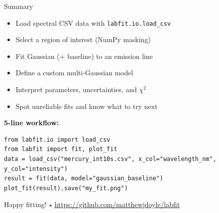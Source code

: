 \documentclass[handout, 10pt]{beamer}
\begin{document}
\begin{frame}[fragile]{Summary}

\begin{tcolorbox}[colback=labgreen!5, colframe=labgreen!80, size=small, title=You can now:]
\begin{itemize}
    \item Load spectral CSV data with \texttt{labfit.io.load\_csv}
    \item Select a region of interest (NumPy masking)
    \item Fit Gaussian ($+$ baseline) to an emission line
    \item Define a custom multi-Gaussian model
    \item Interpret parameters, uncertainties, and $\chi^2$
    \item Spot unreliable fits and know what to try next
\end{itemize}
\end{tcolorbox}

\vspace{6pt}
\textbf{5-line workflow:}

\begin{lstlisting}[style=pystyle]
from labfit.io import load_csv
from labfit import fit, plot_fit
data = load_csv("mercury_int10s.csv", x_col="wavelength_nm", y_col="intensity")
result = fit(data, model="gaussian_baseline")
plot_fit(result).save("my_fit.png")
\end{lstlisting}

\vspace{4pt}
\centerline{Happy fitting! \quad $\star$ \quad
\url{https://github.com/matthewjdoyle/labfit}}

\end{frame}
\end{document}
